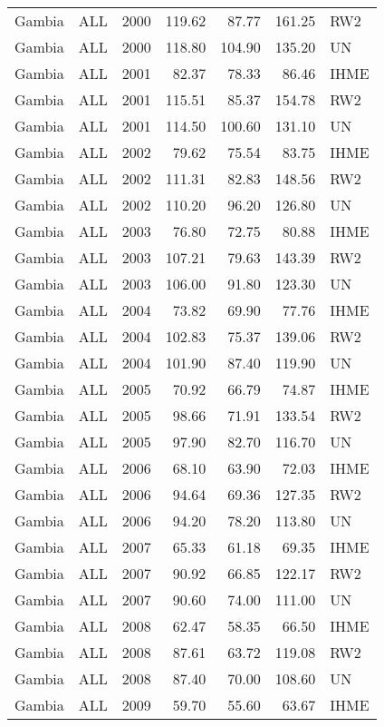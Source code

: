 \begin{longtable}{lllrrrl}
  Gambia & ALL & 2000 & 119.62 & 87.77 & 161.25 & RW2 \\ 
  Gambia & ALL & 2000 & 118.80 & 104.90 & 135.20 & UN \\ 
  Gambia & ALL & 2001 & 82.37 & 78.33 & 86.46 & IHME \\ 
  Gambia & ALL & 2001 & 115.51 & 85.37 & 154.78 & RW2 \\ 
  Gambia & ALL & 2001 & 114.50 & 100.60 & 131.10 & UN \\ 
  Gambia & ALL & 2002 & 79.62 & 75.54 & 83.75 & IHME \\ 
  Gambia & ALL & 2002 & 111.31 & 82.83 & 148.56 & RW2 \\ 
  Gambia & ALL & 2002 & 110.20 & 96.20 & 126.80 & UN \\ 
  Gambia & ALL & 2003 & 76.80 & 72.75 & 80.88 & IHME \\ 
  Gambia & ALL & 2003 & 107.21 & 79.63 & 143.39 & RW2 \\ 
  Gambia & ALL & 2003 & 106.00 & 91.80 & 123.30 & UN \\ 
  Gambia & ALL & 2004 & 73.82 & 69.90 & 77.76 & IHME \\ 
  Gambia & ALL & 2004 & 102.83 & 75.37 & 139.06 & RW2 \\ 
  Gambia & ALL & 2004 & 101.90 & 87.40 & 119.90 & UN \\ 
  Gambia & ALL & 2005 & 70.92 & 66.79 & 74.87 & IHME \\ 
  Gambia & ALL & 2005 & 98.66 & 71.91 & 133.54 & RW2 \\ 
  Gambia & ALL & 2005 & 97.90 & 82.70 & 116.70 & UN \\ 
  Gambia & ALL & 2006 & 68.10 & 63.90 & 72.03 & IHME \\ 
  Gambia & ALL & 2006 & 94.64 & 69.36 & 127.35 & RW2 \\ 
  Gambia & ALL & 2006 & 94.20 & 78.20 & 113.80 & UN \\ 
  Gambia & ALL & 2007 & 65.33 & 61.18 & 69.35 & IHME \\ 
  Gambia & ALL & 2007 & 90.92 & 66.85 & 122.17 & RW2 \\ 
  Gambia & ALL & 2007 & 90.60 & 74.00 & 111.00 & UN \\ 
  Gambia & ALL & 2008 & 62.47 & 58.35 & 66.50 & IHME \\ 
  Gambia & ALL & 2008 & 87.61 & 63.72 & 119.08 & RW2 \\ 
  Gambia & ALL & 2008 & 87.40 & 70.00 & 108.60 & UN \\ 
  Gambia & ALL & 2009 & 59.70 & 55.60 & 63.67 & IHME \\ 

\end{longtable}
